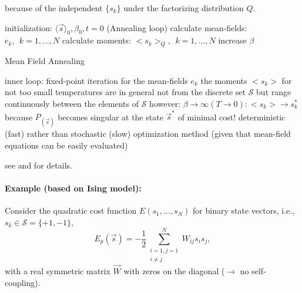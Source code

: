 because of the independent $\{s_k\}$  under the factorizing distribution $Q$.

\begin{algorithm}[h]
  \DontPrintSemicolon
  initialization: $\langle \vec{s} \rangle_0, \beta_0, t = 0$ \;
  \Begin(Annealing loop){ 
    {
      calculate mean-fields: $e_k, \ \ k = 1, \ldots, N$ \;
      calculate moments: $\big<s_k\big>_Q,\ \ k = 1, \ldots, N$ \;
    }
    increase $\beta$ \;
    }
    \label{alg:MeanFieldAnnealing}
    \caption{Mean Field Annealing}
  \end{algorithm}

\begin{itemize}
	\itR inner loop: fixed-point iteration  for the mean-fields $e_k$
	\itR the moments $\big< s_k \big>$ for not too small temperatures are in general not from the discrete set $\mathcal{S}$ 
	  but range continuously between the elements of $\mathcal{S}$ 
	\itR however: $\beta \rightarrow \infty (T \rightarrow 0): \big< s_k \big>
		\rightarrow s_k^{*}$ \\
		because $P_{(\vec{s})}$ becomes singular at the state 
		$\vec{s}^*$ of minimal cost!
	\itR deterministic (fast) rather than stochastic (slow) optimization
		method (given that mean-field equations can be easily evaluated)
\end{itemize}

see \textcite{BilbroEtAl1989} and \textcite{Rose1998} for details. 
\\

\paragraph{Example (based on Ising model):}
Consider the quadratic cost function $E(s_1, \dots, s_N)$ for binary state vectors, i.e., $s_k \in \mathcal{S} = \{+1, -1\}$,
\begin{equation}
 E_p(\vec{s}) = -\frac{1}{2} \sum\limits_{\substack{i=1,j=1 \\ i\ne j}}^N W_{ij} s_i s_j,
\end{equation}
with a real symmetric matrix $\vec{W}$ with zeros on the diagonal ($\to$ no self-coupling).

